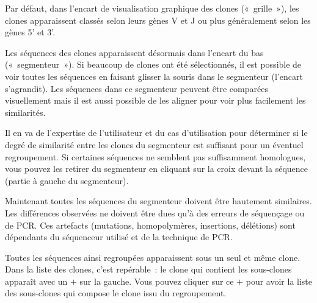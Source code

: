 \documentclass[10pt]{article}
\begin{document}
{Par défaut, dans l'encart de visualisation graphique des clones
(«~grille~»), les clones apparaissent classés selon leurs gènes V et J
ou plus généralement selon les gènes 5' et 3'.


Les séquences des clones apparaissent désormais dans l'encart du bas
(«~segmenteur~»). Si beaucoup de clones ont été sélectionnés, il est
possible de voir toutes les séquences en faisant glisser la souris dans
le segmenteur (l'encart s'agrandit). Les séquences dans ce segmenteur
peuvent être comparées visuellement mais il est aussi possible de les
aligner pour voir plus facilement les similarités.

Il en va de l'expertise de l'utilisateur et du cas d'utilisation pour déterminer si le degré de
similarité entre les clones du segmenteur est suffisant pour un éventuel
regroupement. Si certaines séquences ne semblent pas suffisamment homologues,
vous pouvez les retirer du segmenteur en cliquant sur la croix devant la
séquence (partie à gauche du segmenteur).


Maintenant toutes les séquences du segmenteur doivent être hautement
similaires. Les différences observées ne doivent être dues qu'à des
erreurs de séquençage ou de PCR. Ces artefacts (mutations,
homopolymères, insertions, délétions) sont dépendants du séquenceur
utilisé et de la technique de PCR.


Toutes les séquences ainsi regroupées apparaissent sous un seul et même
clone. Dans la liste des clones, c'est repérable~: le clone qui contient
les sous-clones apparaît avec un $+$ sur la gauche. Vous pouvez
cliquer sur ce $+$ pour avoir la liste des sous-clones qui compose le
clone issu du regroupement.


}
\end{document}
